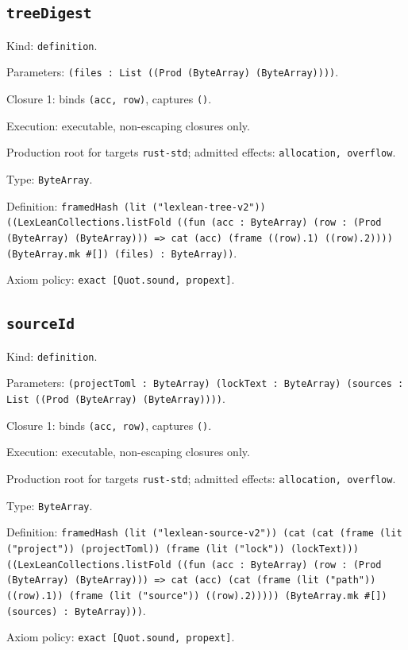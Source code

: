 \documentclass[11pt]{article}
\begin{document}
\subsection*{\texttt{treeDigest}}
\noindent Kind: \texttt{definition}.\par
\noindent Parameters: \texttt{(files : List ((Prod (ByteArray) (ByteArray))))}.\par
\noindent Closure 1: binds \texttt{(acc, row)}, captures \texttt{()}.\par
\noindent Execution: executable, non-escaping closures only.\par
\noindent Production root for targets \texttt{rust-std}; admitted effects: \texttt{allocation, overflow}.\par
\noindent Type: \texttt{ByteArray}.\par
\noindent Definition: \texttt{framedHash (lit ("lexlean-tree-v2")) ((LexLeanCollections.listFold ((fun (acc : ByteArray) (row : (Prod (ByteArray) (ByteArray))) => cat (acc) (frame ((row).1) ((row).2)))) (ByteArray.mk \#[]) (files) : ByteArray))}.\par
\noindent Axiom policy: \texttt{exact [Quot.sound, propext]}.\par
\subsection*{\texttt{sourceId}}
\noindent Kind: \texttt{definition}.\par
\noindent Parameters: \texttt{(projectToml : ByteArray) (lockText : ByteArray) (sources : List ((Prod (ByteArray) (ByteArray))))}.\par
\noindent Closure 1: binds \texttt{(acc, row)}, captures \texttt{()}.\par
\noindent Execution: executable, non-escaping closures only.\par
\noindent Production root for targets \texttt{rust-std}; admitted effects: \texttt{allocation, overflow}.\par
\noindent Type: \texttt{ByteArray}.\par
\noindent Definition: \texttt{framedHash (lit ("lexlean-source-v2")) (cat (cat (frame (lit ("project")) (projectToml)) (frame (lit ("lock")) (lockText))) ((LexLeanCollections.listFold ((fun (acc : ByteArray) (row : (Prod (ByteArray) (ByteArray))) => cat (acc) (cat (frame (lit ("path")) ((row).1)) (frame (lit ("source")) ((row).2))))) (ByteArray.mk \#[]) (sources) : ByteArray)))}.\par
\noindent Axiom policy: \texttt{exact [Quot.sound, propext]}.\par
\end{document}
